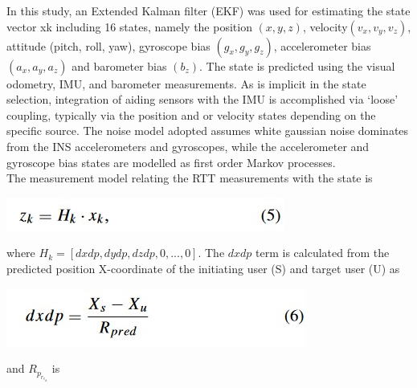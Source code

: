 In this study, an Extended Kalman filter (EKF) was used
for estimating the state vector xk including 16 states, namely
the position \begin{math}(x, y, z)\end{math}, velocity\begin{math} (v_x , v_y , v_z )\end{math}, attitude (pitch,
roll, yaw), gyroscope bias \begin{math}(g_x , g_y , g_z )\end{math}, accelerometer bias \begin{math}(a_x , a_y , a_z )\end{math} and barometer bias \begin{math}(b_z )\end{math}. The state is predicted
using the visual odometry, IMU, and barometer measurements.
As is implicit in the state selection, integration of aiding
sensors with the IMU is accomplished via ‘loose’ coupling,
typically via the position and or velocity states depending on
the specific source. The noise model adopted assumes white
gaussian noise dominates from the INS accelerometers and
gyroscopes, while the accelerometer and gyroscope bias states
are modelled as first order Markov processes.\\
The measurement model relating the RTT measurements
with the state is  
\begin{center}
   \includegraphics{eq5.jpg}
   \end{center}
where \begin{math}H_k = [dxdp, dydp, dzdp, 0, . . ., 0]\end{math}. The \begin{math}dxdp\end{math} term
is calculated from the predicted position X-coordinate of the
initiating user (S) and target user (U) as   
\begin{center}
   \includegraphics{eq6.jpg}
   \end{center}
and \begin{math}R_p_r_e_d\end{math} is   
